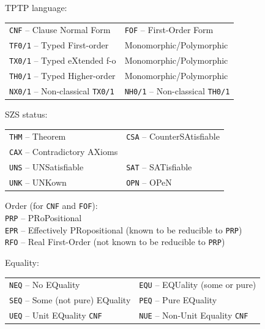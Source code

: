 \documentclass[runningheads]{llncs}
\newenvironment{packed_itemize}{
\vspace*{-0.2em}
\begin{itemize}
\setlength{\partopsep}{0pt}
\setlength{\itemsep}{1pt}
\setlength{\parskip}{0pt}
\setlength{\parsep}{0pt}
}{\end{itemize}}
\begin{document}
\begin{figure}[bht]
\centering
\begin{packed_itemize}
\item TPTP language: \\
      \begin{tabular}{@{}p{5cm}l}
      {\tt CNF} -- Clause Normal Form &
      {\tt FOF} -- First-Order Form \\
      {\tt TF0/1} -- Typed First-order & Monomorphic/Polymorphic \\
      {\tt TX0/1} -- Typed eXtended f-o & Monomorphic/Polymorphic \\
      {\tt TH0/1} -- Typed Higher-order & Monomorphic/Polymorphic \\
      {\tt NX0/1} -- Non-classical {\tt TX0/1} &
      {\tt NH0/1} -- Non-classical {\tt TH0/1} \\
      \end{tabular}
\item SZS status: \\
      \begin{tabular}{@{}p{5cm}l}
      {\tt THM} -- Theorem &
      {\tt CSA} -- CounterSAtisfiable \\
      {\tt CAX} -- Contradictory AXioms & \\
      {\tt UNS} -- UNSatisfiable &
      {\tt SAT} -- SATisfiable \\
      {\tt UNK} -- UNKown &
      {\tt OPN} -- OPeN \\
      \end{tabular}
\item Order (for {\tt CNF} and {\tt FOF}): \\
      {\tt PRP} -- PRoPositional \\
      {\tt EPR} -- Effectively PRopositional (known to be reducible to {\tt PRP}) \\
      {\tt RFO} -- Real First-Order (not known to be reducible to {\tt PRP})
\item Equality: \\
      \begin{tabular}{@{}p{5cm}l}
      {\tt NEQ} -- No EQuality &
      {\tt EQU} -- EQUality (some or pure) \\
      {\tt SEQ} -- Some (not pure) EQuality &
      {\tt PEQ} -- Pure EQuality \\
      {\tt UEQ} -- Unit EQuality {\tt CNF} &
      {\tt NUE} -- Non-Unit Equality {\tt CNF} \\
      \end{tabular}

\end{packed_itemize}
\end{figure}
\end{document}

